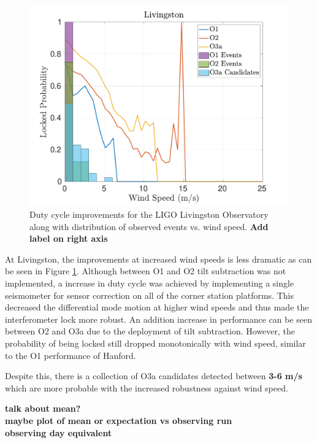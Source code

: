 \documentclass [12pt, proquest]{uwthesis}[2019]
\begin{document}
\begin{figure}%
\begin{center}
\includegraphics[width=\textwidth]{LLO_WindVsLockEvents.pdf}
\caption[Duty cycle improvements for the LIGO Livingston Observatory]{Duty cycle improvements for the LIGO Livingston Observatory along with distribution of observed events vs. wind speed. \textbf{Add label on right axis}}
\label{LLO_events}
\end{center}
\end{figure}

At Livingston, the improvements at increased wind speeds is less dramatic as can be seen in Figure \ref{LLO_events}. Although between O1 and O2 tilt subtraction was not implemented, a increase in duty cycle was achieved by implementing a single seismometer for sensor correction on all of the corner station platforms. This decreased the differential mode motion at higher wind speeds and thus made the interferometer lock more robust. An addition increase in performance can be seen between O2 and O3a due to the deployment of tilt subtraction. However, the probability of being locked still dropped monotonically with wind speed, similar to the O1 performance of Hanford.

Despite this, there is a collection of O3a candidates detected between \textbf{3-6 m/s} which are more probable with the increased robustness against wind speed.

\textbf{talk about mean?}\\
\textbf{maybe plot of mean or expectation vs observing run}\\
\textbf{observing day equivalent}
\end{document}

